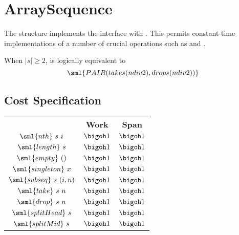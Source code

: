 \chapter{ArraySequence}
\label{ch:array-seq}

\begin{cluster}
\label{grp:grm:array-seq::arraysequence}

\begin{gram}
\label{grm:array-seq::arraysequence}
\label{ch:array-seq}
\begin{preamble}
The  structure implements the  interface
with . This permits constant-time
implementations of a number of crucial operations such as  and
.
\end{preamble}

\end{gram}
\end{cluster}

\begin{cluster}
\label{grp:grm:array-seq::implementation-defined-behavior}

\begin{gram}
\label{grm:array-seq::implementation-defined-behavior}
When $|s| \geq 2$,  is logically equivalent to
\[
  \sml{PAIR (take s (n div 2), drop s (n div 2))}
\]

\end{gram}
\end{cluster}


\section{Cost Specification}
\label{sec:array-seq::cost-specification}

\begin{cluster}
\label{grp:cst:array-seq::constant-work-operations}

\begin{costspec}
\label{cst:array-seq::constant-work-operations}
\begin{tabular}{c|c|c}
& \textbf{Work} & \textbf{Span} \\
$\sml{nth}~s~i$ & $\bigoh 1$ & $\bigoh 1$ \\
$\sml{length}~s$ & $\bigoh 1$ & $\bigoh 1$ \\
$\sml{empty}~()$ & $\bigoh 1$ & $\bigoh 1$ \\
$\sml{singleton}~x$ & $\bigoh 1$ & $\bigoh 1$ \\
$\sml{subseq}~s~(i,n)$ & $\bigoh 1$ & $\bigoh 1$ \\
$\sml{take}~s~n$ & $\bigoh 1$ & $\bigoh 1$ \\
$\sml{drop}~s~n$ & $\bigoh 1$ & $\bigoh 1$ \\
$\sml{splitHead}~s$ & $\bigoh 1$ & $\bigoh 1$ \\
$\sml{splitMid}~s$ & $\bigoh 1$ & $\bigoh 1$
\end{tabular}

\end{costspec}
\end{cluster}


